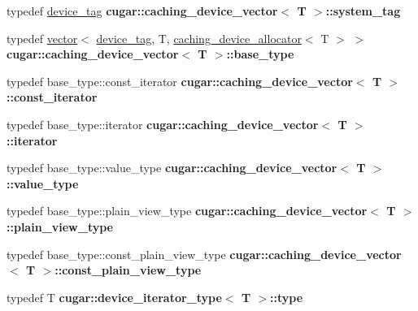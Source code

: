 \begin{DoxyCompactItemize}
\mbox{\label{group___basic_ga3e06bddc20439551e26019efe8786ccd}} 
typedef \hyperlink{structcugar_1_1device__tag}{device\+\_\+tag} {\bfseries cugar\+::caching\+\_\+device\+\_\+vector$<$ T $>$\+::system\+\_\+tag}
\item 
\mbox{\label{group___basic_ga39079e26c4388504f67727d6d5e09c39}} 
typedef \hyperlink{structcugar_1_1vector}{vector}$<$ \hyperlink{structcugar_1_1device__tag}{device\+\_\+tag}, T, \hyperlink{structcugar_1_1caching__device__allocator}{caching\+\_\+device\+\_\+allocator}$<$ T $>$ $>$ {\bfseries cugar\+::caching\+\_\+device\+\_\+vector$<$ T $>$\+::base\+\_\+type}
\item 
\mbox{\label{group___basic_ga8cccfb6cdb36c481874f46f3743270ec}} 
typedef base\+\_\+type\+::const\+\_\+iterator {\bfseries cugar\+::caching\+\_\+device\+\_\+vector$<$ T $>$\+::const\+\_\+iterator}
\item 
\mbox{\label{group___basic_gafb337adc2469b6980a85a5ca38304664}} 
typedef base\+\_\+type\+::iterator {\bfseries cugar\+::caching\+\_\+device\+\_\+vector$<$ T $>$\+::iterator}
\item 
\mbox{\label{group___basic_ga9649d5147cea1a5f2ba590b5fd93afd1}} 
typedef base\+\_\+type\+::value\+\_\+type {\bfseries cugar\+::caching\+\_\+device\+\_\+vector$<$ T $>$\+::value\+\_\+type}
\item 
\mbox{\label{group___basic_ga082e2ff460b915506fb5eae0780dde8e}} 
typedef base\+\_\+type\+::plain\+\_\+view\+\_\+type {\bfseries cugar\+::caching\+\_\+device\+\_\+vector$<$ T $>$\+::plain\+\_\+view\+\_\+type}
\item 
\mbox{\label{group___basic_gaaa19b686e9ac255b59c7fe76e10c77d5}} 
typedef base\+\_\+type\+::const\+\_\+plain\+\_\+view\+\_\+type {\bfseries cugar\+::caching\+\_\+device\+\_\+vector$<$ T $>$\+::const\+\_\+plain\+\_\+view\+\_\+type}
\item 
\mbox{\label{group___basic_ga9f5174d4adbd2ebab4c772064e4dae12}} 
typedef T {\bfseries cugar\+::device\+\_\+iterator\+\_\+type$<$ T $>$\+::type}
\item 
\mbox{\label{group___basic_gabcf5d91160edd42e31041d51c7bce397}} 

\end{DoxyCompactItemize}
